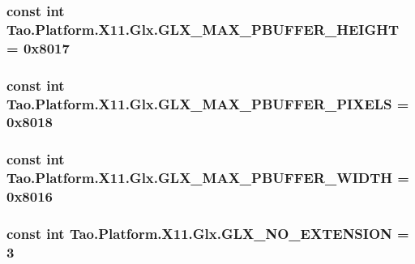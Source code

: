 \label{class_tao_1_1_platform_1_1_x11_1_1_glx_a9413f7ed62658e17be5cfec7fa63f08d}
\hypertarget{class_tao_1_1_platform_1_1_x11_1_1_glx_aace265087d8b7559282f6b773c747b75}{
\subsubsection[{GLX\_\-MAX\_\-PBUFFER\_\-HEIGHT}]{\setlength{\rightskip}{0pt plus 5cm}const int {\bf Tao.Platform.X11.Glx.GLX\_\-MAX\_\-PBUFFER\_\-HEIGHT} = 0x8017}}
\label{class_tao_1_1_platform_1_1_x11_1_1_glx_aace265087d8b7559282f6b773c747b75}
\hypertarget{class_tao_1_1_platform_1_1_x11_1_1_glx_a9824a3a00017f01c9afc95553a295504}{
\subsubsection[{GLX\_\-MAX\_\-PBUFFER\_\-PIXELS}]{\setlength{\rightskip}{0pt plus 5cm}const int {\bf Tao.Platform.X11.Glx.GLX\_\-MAX\_\-PBUFFER\_\-PIXELS} = 0x8018}}
\label{class_tao_1_1_platform_1_1_x11_1_1_glx_a9824a3a00017f01c9afc95553a295504}
\hypertarget{class_tao_1_1_platform_1_1_x11_1_1_glx_a94799aa9360ef6848752dc1cffbf2e09}{
\subsubsection[{GLX\_\-MAX\_\-PBUFFER\_\-WIDTH}]{\setlength{\rightskip}{0pt plus 5cm}const int {\bf Tao.Platform.X11.Glx.GLX\_\-MAX\_\-PBUFFER\_\-WIDTH} = 0x8016}}
\label{class_tao_1_1_platform_1_1_x11_1_1_glx_a94799aa9360ef6848752dc1cffbf2e09}
\hypertarget{class_tao_1_1_platform_1_1_x11_1_1_glx_a4964628e8c7c0a05fa0c8cf3739770b7}{
\subsubsection[{GLX\_\-NO\_\-EXTENSION}]{\setlength{\rightskip}{0pt plus 5cm}const int {\bf Tao.Platform.X11.Glx.GLX\_\-NO\_\-EXTENSION} = 3}}
